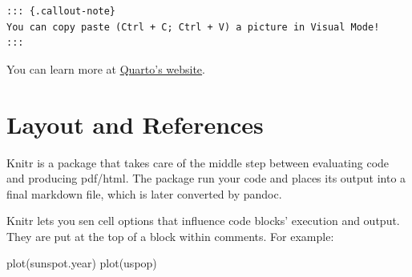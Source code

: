 \documentclass[
  letterpaper,
]{book}
\newenvironment{Shaded}{\begin{snugshade}}{\end{snugshade}}
\newcommand{\FunctionTok}[1]{\textcolor[rgb]{0.28,0.35,0.67}{#1}}
\newcommand{\NormalTok}[1]{\textcolor[rgb]{0.00,0.23,0.31}{#1}}
\begin{document}
\begin{verbatim}
::: {.callout-note}
You can copy paste (Ctrl + C; Ctrl + V) a picture in Visual Mode!
:::
\end{verbatim}

You can learn more at \href{https://quarto.org/}{Quarto's website}.

\hypertarget{layout-and-references}{%
\chapter{Layout and References}\label{layout-and-references}}

Knitr is a package that takes care of the middle step between evaluating
code and producing pdf/html. The package run your code and places its
output into a final markdown file, which is later converted by pandoc.

Knitr lets you sen cell options that influence code blocks' execution
and output. They are put at the top of a block within comments. For
example:

\begin{Shaded}
\begin{Highlighting}[]
\FunctionTok{plot}\NormalTok{(sunspot.year)}
\FunctionTok{plot}\NormalTok{(uspop)}
\end{Highlighting}
\end{Shaded}
\end{document}

